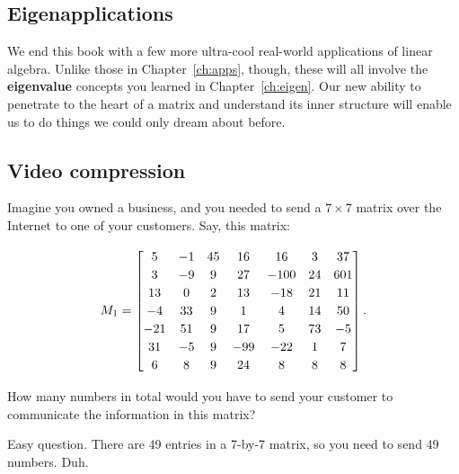 

\begin{alttitles}

\chapter{Eigenapplications}
\label{ch:eigenapps}

We end this book with a few more ultra-cool real-world applications of linear
algebra. Unlike those in Chapter~\ref{ch:apps}, though, these will all involve
the \textbf{eigenvalue} concepts you learned in Chapter~\ref{ch:eigen}. Our
new ability to penetrate to the heart of a matrix and understand its inner
structure will enable us to do things we could only dream about before.

\pagebreak

\renewcommand{\thesubsection}{V\arabic{subsection}.}%
\section{Video compression}

Imagine you owned a business, and you needed to send a $7\times 7$ matrix over
the Internet to one of your customers. Say, this matrix:

\vspace{-.15in}
\begin{align*}
M_1 = 
\begingroup
\renewcommand*{\arraystretch}{1.2}
\begin{bmatrix}
5 & -1 & 45 & 16 & 16 & 3 & 37 \\
3 & -9 & 9  & 27 & -100 & 24 & 601 \\
13 & 0 & 2  & 13 & -18 & 21 & 11 \\
-4 & 33 & 9  & 1 & 4 & 14 & 50 \\
-21 & 51 & 9  & 17 & 5 & 73 & -5 \\
31 & -5 & 9  & -99 & -22 & 1 & 7 \\
6 & 8 & 9  & 24 & 8 & 8 & 8 \\
\end{bmatrix}.
\endgroup
\end{align*}
\vspace{-.15in}

How many numbers in total would you have to send your customer to communicate
the information in this matrix?

Easy question. There are 49 entries in a 7-by-7 matrix, so you need to send 49
numbers. Duh.


\end{alttitles}
